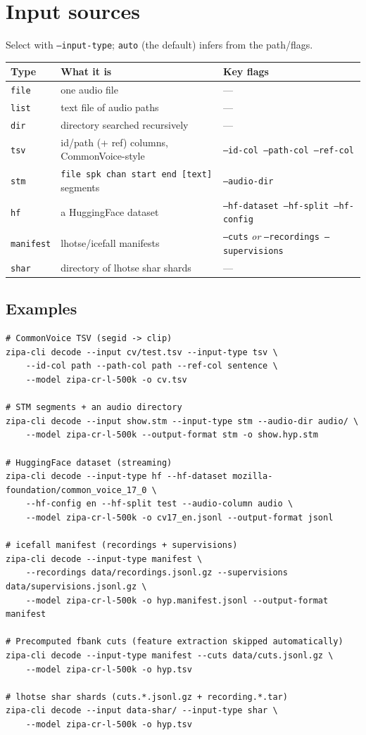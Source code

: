 \documentclass[11pt,a4paper]{article}
\newcommand{\code}[1]{\texttt{#1}}
\begin{document}
\section{Input sources}
Select with \code{--input-type}; \code{auto} (the default) infers from the path/flags.

\begin{longtable}{@{}lll@{}}
\toprule
\textbf{Type} & \textbf{What it is} & \textbf{Key flags} \\
\midrule
\endhead
\code{file} & one audio file & --- \\
\code{list} & text file of audio paths & --- \\
\code{dir} & directory searched recursively & --- \\
\code{tsv} & id/path (+ ref) columns, CommonVoice-style & \code{--id-col --path-col --ref-col} \\
\code{stm} & \code{file spk chan start end [text]} segments & \code{--audio-dir} \\
\code{hf} & a HuggingFace dataset & \code{--hf-dataset --hf-split --hf-config} \\
\code{manifest} & lhotse/icefall manifests & \code{--cuts} \emph{or} \code{--recordings --supervisions} \\
\code{shar} & directory of lhotse shar shards & --- \\
\bottomrule
\end{longtable}

\subsection{Examples}
\begin{lstlisting}
# CommonVoice TSV (segid -> clip)
zipa-cli decode --input cv/test.tsv --input-type tsv \
    --id-col path --path-col path --ref-col sentence \
    --model zipa-cr-l-500k -o cv.tsv

# STM segments + an audio directory
zipa-cli decode --input show.stm --input-type stm --audio-dir audio/ \
    --model zipa-cr-l-500k --output-format stm -o show.hyp.stm

# HuggingFace dataset (streaming)
zipa-cli decode --input-type hf --hf-dataset mozilla-foundation/common_voice_17_0 \
    --hf-config en --hf-split test --audio-column audio \
    --model zipa-cr-l-500k -o cv17_en.jsonl --output-format jsonl

# icefall manifest (recordings + supervisions)
zipa-cli decode --input-type manifest \
    --recordings data/recordings.jsonl.gz --supervisions data/supervisions.jsonl.gz \
    --model zipa-cr-l-500k -o hyp.manifest.jsonl --output-format manifest

# Precomputed fbank cuts (feature extraction skipped automatically)
zipa-cli decode --input-type manifest --cuts data/cuts.jsonl.gz \
    --model zipa-cr-l-500k -o hyp.tsv

# lhotse shar shards (cuts.*.jsonl.gz + recording.*.tar)
zipa-cli decode --input data-shar/ --input-type shar \
    --model zipa-cr-l-500k -o hyp.tsv
\end{lstlisting}
\end{document}
